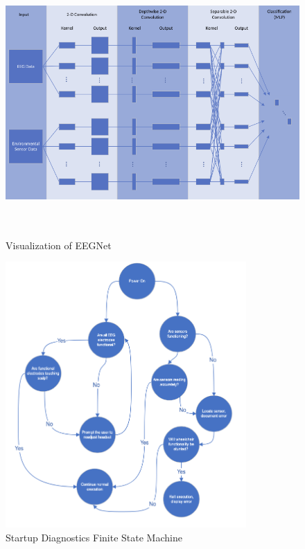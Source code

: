 \documentclass[conference]{IEEEtran}
\begin{document}
    \onecolumn
    \begin{figure}
        \centering
        \centerline{\includegraphics[height=4in, keepaspectratio]{figs/E/eegnet.png}}
        \caption{Visualization of EEGNet}
        \label{fig:eegnet}
    \end{figure}
    \begin{figure}
        \centering
        \centerline{\includegraphics[height=4in, keepaspectratio]{figs/E/initial_diag_fsm.png}}
        \caption{Startup Diagnostics Finite State Machine}
        \label{fig:initial_diag}
    \end{figure}
    \twocolumn
    
\end{document}
